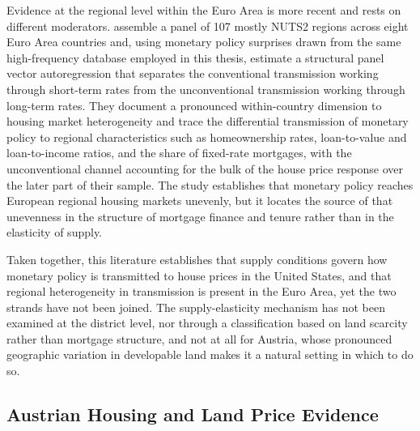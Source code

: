 \documentclass[a4paper,12pt, headsepline]{scrartcl}
\numberwithin{equation}{section}
\begin{document}
Evidence at the regional level within the Euro Area is more recent and rests on different moderators. \citet{battistini2025} assemble a panel of 107 mostly NUTS2 regions across eight Euro Area countries and, using monetary policy surprises drawn from the same high-frequency database employed in this thesis, estimate a structural panel vector autoregression that separates the conventional transmission working through short-term rates from the unconventional transmission working through long-term rates. They document a pronounced within-country dimension to housing market heterogeneity and trace the differential transmission of monetary policy to regional characteristics such as homeownership rates, loan-to-value and loan-to-income ratios, and the share of fixed-rate mortgages, with the unconventional channel accounting for the bulk of the house price response over the later part of their sample. The study establishes that monetary policy reaches European regional housing markets unevenly, but it locates the source of that unevenness in the structure of mortgage finance and tenure rather than in the elasticity of supply.

Taken together, this literature establishes that supply conditions govern how monetary policy is transmitted to house prices in the United States, and that regional heterogeneity in transmission is present in the Euro Area, yet the two strands have not been joined. The supply-elasticity mechanism has not been examined at the district level, nor through a classification based on land scarcity rather than mortgage structure, and not at all for Austria, whose pronounced geographic variation in developable land makes it a natural setting in which to do so. 

\subsection{Austrian Housing and Land Price Evidence}\label{subsec:at-evidence}
\end{document}
